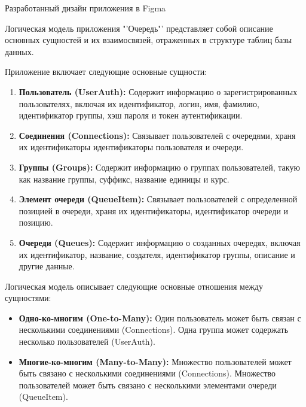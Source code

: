 \begin{image}
	\caption{Разработанный дизайн приложения в Figma}
	\label{fig:figma}
\end{image}


Логическая модель приложения "'Очередь"' представляет собой описание основных
сущностей и их взаимосвязей, отраженных в структуре таблиц базы данных.


Приложение включает следующие основные сущности:

\begin{enumerate}
    \item \textbf{Пользователь (UserAuth):} Содержит информацию
		о зарегистрированных пользователях, включая их идентификатор,
		логин, имя, фамилию, идентификатор группы,
		хэш пароля и токен аутентификации.
    \item \textbf{Соединения (Connections):} Связывает пользователей
		с очередями, храня их идентификаторы идентификаторы пользователя
		и очереди.
    \item \textbf{Группы (Groups):} Содержит информацию
		о группах пользователей, такую как название группы, суффикс,
		название единицы и курс.
    \item \textbf{Элемент очереди (QueueItem):} Связывает пользователей
		с определенной позицией в очереди, храня их идентификаторы,
		идентификатор очереди и позицию.
    \item \textbf{Очереди (Queues):} Содержит информацию о созданных очередях,
		включая их идентификатор, название, создателя, идентификатор группы,
		описание и другие данные.
\end{enumerate}


Логическая модель описывает следующие основные отношения между сущностями:

\begin{itemize}
    \item \textbf{Одно-ко-многим (One-to-Many):}
		Один пользователь может быть связан
		с несколькими соединениями (Connections).
		Одна группа может содержать несколько пользователей (UserAuth).
    \item \textbf{Многие-ко-многим (Many-to-Many):}
		Множество пользователей может быть связано
		с несколькими соединениями (Connections).
		Множество пользователей может быть связано
		с несколькими элементами очереди (QueueItem).
\end{itemize}

